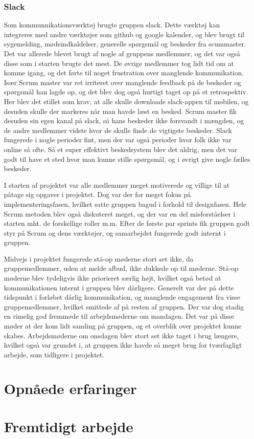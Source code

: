 \subsubsection{Slack}
Som kommunnikationsværktøj brugte gruppen slack. Dette værktøj kan integreres med andre værktøjer som github og google kalender, og blev brugt til sygemelding, mødeindkaldelser, generelle spørgsmål og beskeder fra scummaster. Det var allerede blevet brugt af nogle af gruppens medlemmer, og det var også disse som i starten brugte det mest. De øvrige medlemmer tog lidt tid om at komme igang, og det førte til noget frustration over manglende kommunikation. Især Scrum master var ret irriteret over manglende feedback på de beskeder og spørgsmål han lagde op, og det blev dog også hurtigt taget op på et retrospektiv. Her blev det stillet som krav, at alle skulle downloade slack-appen til mobilen, og desuden skulle der markeres når man havde læst en besked. Scrum master fik desuden sin egen kanal på slack, så hans beskeder ikke forsvandt i mængden, og de andre medlemmer vidste hvor de skulle finde de vigtigste 
beskeder. Slack fungerede i nogle perioder fint, men der var også perioder hvor folk ikke var online så ofte. Så et super effektivt beskedsystem blev det aldrig, men det var godt til have et sted hvor man kunne stille spørgsmål, og i øvrigt give nogle fælles beskeder.

I starten af projektet var alle medlemmer meget motiverede og villige til at påtage sig opgaver i projektet. Dog var der for meget fokus på implementeringsfasen, hvilket satte gruppen bagud i forhold til designfasen. Hele Scrum metoden blev også diskuteret meget, og der var en del misforståelser i starten mht. de forskellige roller m.m. Efter de første par sprints fik gruppen godt styr på Scrum og dens værktøjer, og samarbejdet fungerede godt internt i gruppen.

Midvejs i projektet fungerede stå-op møderne stort set ikke, da gruppemedlemmer, uden at melde afbud, ikke dukkede op til møderne. Stå-op møderne blev tydeligvis ikke priorieret særlig højt, hvilket også betød at kommunikationen internt i gruppen blev dårligere. Generelt var der på dette tidspunkt i forløbet dårlig kommunikation, og manglende engagement fra visse gruppemedlemmer, hvilket smittede af på resten af gruppen.
Der var dog stadig en rimelig god fremmøde til arbejdsmøderne om mandagen. Det var på disse møder at der kom lidt samling på gruppen, og et overblik over projektet kunne skabes. Arbejdsmøderne om onsdagen blev stort set ikke taget i brug længere, hvilket også var grundet i, at gruppen ikke havde så meget brug for tværfagligt arbejde, som tidligere i projektet.

\section{Opnåede erfaringer}

\section{Fremtidigt arbejde}
